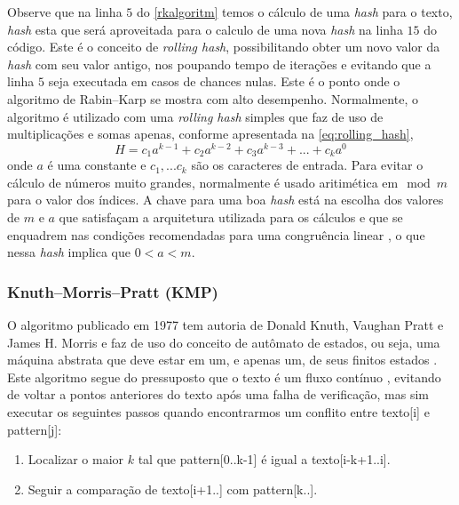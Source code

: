 Observe que na linha $5$ do \autoref{rkalgoritm} temos o cálculo de uma \textit{hash} para o texto, \textit{hash} esta que será aproveitada para o calculo de uma nova \textit{hash} na linha $15$ do código. Este é o conceito de \textit{rolling hash}, possibilitando obter um novo valor da \textit{hash} com seu valor antigo, nos poupando tempo de iterações e evitando que a linha $5$ seja executada em casos de chances nulas. Este é o ponto onde o algoritmo de Rabin–Karp se mostra com alto desempenho. Normalmente, o algoritmo é utilizado com uma \textit{rolling hash} simples que faz de uso  de multiplicações e somas apenas, conforme apresentada na \autoref{eq:rolling_hash},
%
\begin{equation}\label{eq:rolling_hash}
	H=c_1a^{k-1}+ c_2a^{k-2} + c_3a^{k-3} + ... + c_ka^{0}
\end{equation}
%
onde $a$ é uma constante e $c_1,...c_k$ são os caracteres de entrada. Para evitar o cálculo de números muito grandes, normalmente é usado aritimética em$\mod m$ para o valor dos índices. A chave para uma boa \textit{hash} está na escolha dos valores de $m$ e $a$ que satisfaçam a arquitetura utilizada para os cálculos e que se enquadrem nas condições recomendadas para uma congruência linear \cite{knuth1998art}, o que nessa \textit{hash} implica que $0<a<m$.


\subsubsection*{Knuth–Morris–Pratt (KMP)} %
\label{ssub:knuth_morris_pratt_}

O algoritmo publicado em 1977 tem autoria de  Donald Knuth, Vaughan Pratt e James H. Morris e faz de uso do conceito de autômato de estados, ou seja, uma máquina abstrata que deve estar em um, e apenas um, de seus finitos estados \cite{thierbach1985finite}. Este algoritmo segue do pressuposto que o texto é um fluxo contínuo \cite{paulo2015algoritmos}, evitando de voltar a pontos anteriores do texto após uma falha de verificação, mas sim executar os seguintes passos quando encontrarmos um conflito entre {\code texto[i]} e {\code pattern[j]}:

\begin{enumerate}
	\item Localizar o maior $k$ tal que {\code pattern[0..k-1]} é igual a {\code texto[i-k+1..i]}.
	\item Seguir a comparação de {\code texto[i+1..]} com {\code pattern[k..]}.
\end{enumerate}

